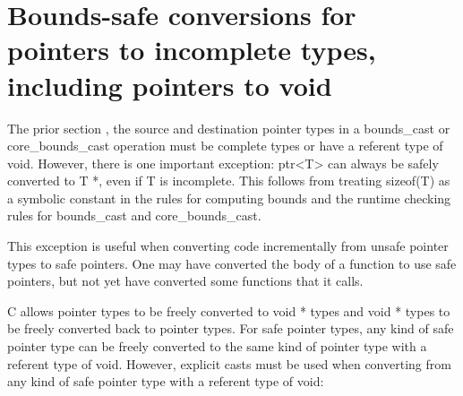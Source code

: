 \section{Bounds-safe conversions for pointers to incomplete types, including pointers to void}\label{bounds-safe-conversions-for-pointers-to-incomplete-types-including-pointers-to-void}

The prior section , the source and destination pointer types in a
bounds\_cast or core\_bounds\_cast operation must be complete types or
have a referent type of void. However, there is one important exception:
ptr\textless{}T\textgreater{} can always be safely converted to T *,
even if T is incomplete. This follows from treating sizeof(T) as a
symbolic constant in the rules for computing bounds and the runtime
checking rules for bounds\_cast and core\_bounds\_cast.

This exception is useful when converting code incrementally from unsafe
pointer types to safe pointers. One may have converted the body of a
function to use safe pointers, but not yet have converted some functions
that it calls.

C allows pointer types to be freely converted to void * types and void *
types to be freely converted back to pointer types. For safe pointer
types, any kind of safe pointer type can be freely converted to the same
kind of pointer type with a referent type of void. However, explicit
casts must be used when converting from any kind of safe pointer type
with a referent type of void:


